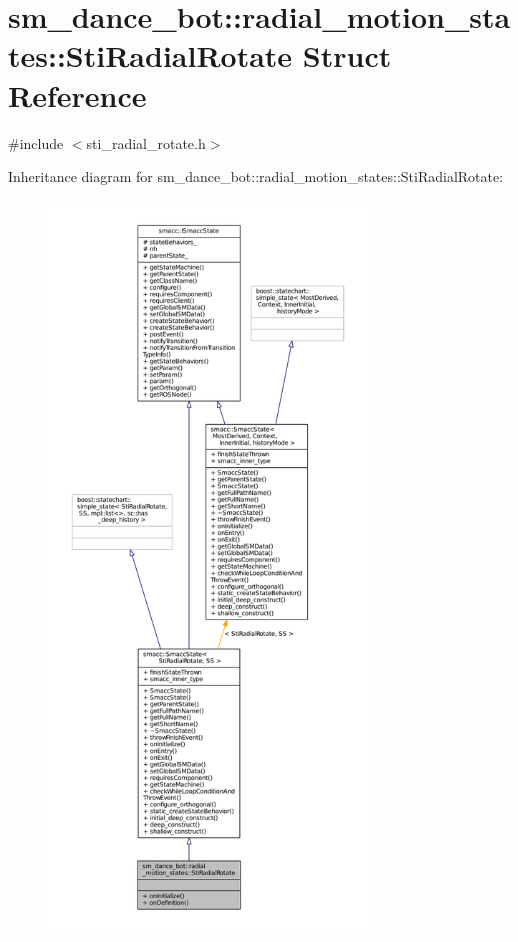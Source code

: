 \hypertarget{structsm__dance__bot_1_1radial__motion__states_1_1StiRadialRotate}{}\section{sm\+\_\+dance\+\_\+bot\+:\+:radial\+\_\+motion\+\_\+states\+:\+:Sti\+Radial\+Rotate Struct Reference}
\label{structsm__dance__bot_1_1radial__motion__states_1_1StiRadialRotate}


{\ttfamily \#include $<$sti\+\_\+radial\+\_\+rotate.\+h$>$}



Inheritance diagram for sm\+\_\+dance\+\_\+bot\+:\+:radial\+\_\+motion\+\_\+states\+:\+:Sti\+Radial\+Rotate\+:
\nopagebreak
\begin{figure}[H]
\begin{center}
\leavevmode
\includegraphics[height=550pt]{structsm__dance__bot_1_1radial__motion__states_1_1StiRadialRotate__inherit__graph}
\end{center}
\end{figure}


